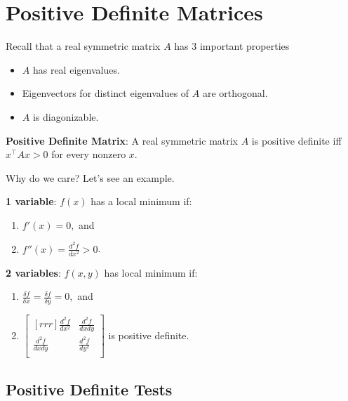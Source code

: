 \section{Positive Definite Matrices}

Recall that a real symmetric matrix $A$ has 3 important properties
\begin{itemize}
    \item $A$ has real eigenvalues.
    \item Eigenvectors for distinct eigenvalues of $A$ are orthogonal.
    \item $A$ is diagonizable.
\end{itemize}

\begin{definition}
    \textbf{Positive Definite Matrix}: A real symmetric matrix $A$ is positive definite iff $x^\intercal A x > 0$ for every nonzero $x$.
\end{definition}

\begin{example} Why do we care? Let's see an example.

\textbf{1 variable}: $f(x)$ has a local minimum if:
\begin{enumerate}
    \item $f'(x)=0,$ and
    \item $f''(x)=\frac{d^2f}{dx^2}>0$.
\end{enumerate}

\textbf{2 variables}: $f(x,y)$ has local minimum if:
    \begin{enumerate}
        \item $ \frac{\delta f}{\delta x} = \frac{\delta f}{\delta y} = 0,$ and
        \item $\begin{bmatrix}[rrr]
         \frac{d^2f}{dx^2} & \frac{d^2f}{dxdy} \\
         \frac{d^2f}{dxdy} & \frac{d^2f}{dy^2}  \\
     \end{bmatrix}$ is positive definite.
    \end{enumerate}
\end{example}

\subsection{Positive Definite Tests}

